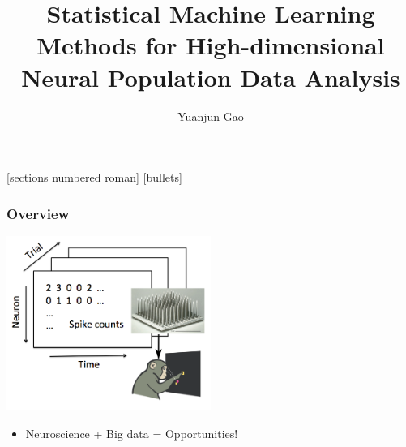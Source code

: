 \documentclass[16pt,presentation]{beamer}
\author[Yuanjun Gao]{Yuanjun Gao}
\institute{\small Department of Statistics\\ Columbia University}
\title[Department of Statistics, Columbia University]{\large Statistical Machine Learning Methods for High-dimensional Neural Population Data Analysis}
\date{}
\begin{document}

\beamertemplatetransparentcovereddynamicmedium
{}[sections numbered roman]
[bullets]


\begin{frame}\vspace*{1.5cm}
\maketitle
\begin{center}
\vspace{-1cm}
\end{center}
\end{frame}


\begin{frame}
\frametitle{Overview}
\centering
\includegraphics[width = 0.50\textwidth]{./figs/gclds/fig_monkey.png}
\begin{itemize}
\item Neuroscience + Big data = \alert{Opportunities}!
\end{itemize}
\end{frame}
\end{document}
